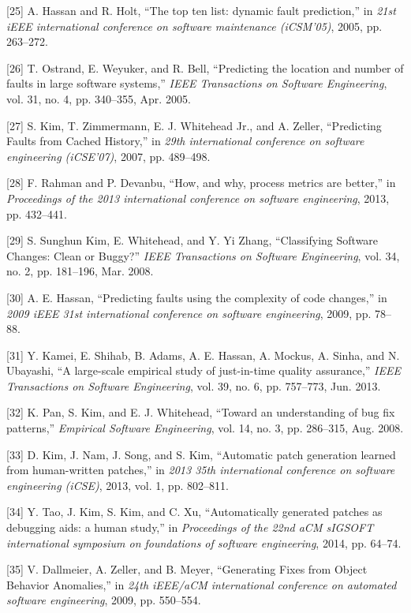 \documentclass[conference]{IEEEtran}
\begin{document}
{[}25{]} A. Hassan and R. Holt, ``The top ten list: dynamic fault
prediction,'' in \emph{21st iEEE international conference on software
maintenance (iCSM'05)}, 2005, pp. 263--272.

{[}26{]} T. Ostrand, E. Weyuker, and R. Bell, ``Predicting the location
and number of faults in large software systems,'' \emph{IEEE
Transactions on Software Engineering}, vol. 31, no. 4, pp. 340--355,
Apr. 2005.

{[}27{]} S. Kim, T. Zimmermann, E. J. {Whitehead Jr.}, and A. Zeller,
``Predicting Faults from Cached History,'' in \emph{29th international
conference on software engineering (iCSE'07)}, 2007, pp. 489--498.

{[}28{]} F. Rahman and P. Devanbu, ``How, and why, process metrics are
better,'' in \emph{Proceedings of the 2013 international conference on
software engineering}, 2013, pp. 432--441.

{[}29{]} S. {Sunghun Kim}, E. Whitehead, and Y. {Yi Zhang},
``Classifying Software Changes: Clean or Buggy?'' \emph{IEEE
Transactions on Software Engineering}, vol. 34, no. 2, pp. 181--196,
Mar. 2008.

{[}30{]} A. E. Hassan, ``Predicting faults using the complexity of code
changes,'' in \emph{2009 iEEE 31st international conference on software
engineering}, 2009, pp. 78--88.

{[}31{]} Y. Kamei, E. Shihab, B. Adams, A. E. Hassan, A. Mockus, A.
Sinha, and N. Ubayashi, ``A large-scale empirical study of just-in-time
quality assurance,'' \emph{IEEE Transactions on Software Engineering},
vol. 39, no. 6, pp. 757--773, Jun. 2013.

{[}32{]} K. Pan, S. Kim, and E. J. Whitehead, ``Toward an understanding
of bug fix patterns,'' \emph{Empirical Software Engineering}, vol. 14,
no. 3, pp. 286--315, Aug. 2008.

{[}33{]} D. Kim, J. Nam, J. Song, and S. Kim, ``Automatic patch
generation learned from human-written patches,'' in \emph{2013 35th
international conference on software engineering (iCSE)}, 2013, vol. 1,
pp. 802--811.

{[}34{]} Y. Tao, J. Kim, S. Kim, and C. Xu, ``Automatically generated
patches as debugging aids: a human study,'' in \emph{Proceedings of the
22nd aCM sIGSOFT international symposium on foundations of software
engineering}, 2014, pp. 64--74.

{[}35{]} V. Dallmeier, A. Zeller, and B. Meyer, ``Generating Fixes from
Object Behavior Anomalies,'' in \emph{24th iEEE/aCM international
conference on automated software engineering}, 2009, pp. 550--554.
\end{document}
